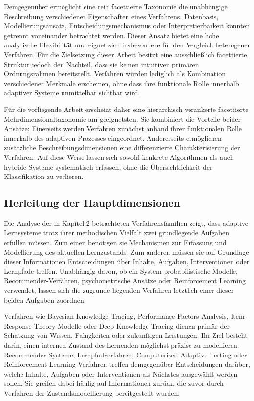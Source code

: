 Demgegenüber ermöglicht eine rein facettierte Taxonomie die unabhängige
Beschreibung verschiedener Eigenschaften eines Verfahrens. Datenbasis,
Modellierungsansatz, Entscheidungsmechanismus oder Interpretierbarkeit
könnten getrennt voneinander betrachtet werden. Dieser Ansatz bietet
eine hohe analytische Flexibilität und eignet sich insbesondere für den
Vergleich heterogener Verfahren. Für die Zielsetzung dieser Arbeit
besitzt eine ausschließlich facettierte Struktur jedoch den Nachteil,
dass sie keinen intuitiven primären Ordnungsrahmen bereitstellt.
Verfahren würden lediglich als Kombination verschiedener Merkmale
erscheinen, ohne dass ihre funktionale Rolle innerhalb adaptiver Systeme
unmittelbar sichtbar wird.

Für die vorliegende Arbeit erscheint daher eine hierarchisch verankerte
facettierte Mehrdimensionaltaxonomie am geeignetsten. Sie kombiniert die
Vorteile beider Ansätze: Einerseits werden Verfahren zunächst anhand
ihrer funktionalen Rolle innerhalb des adaptiven Prozesses eingeordnet.
Andererseits ermöglichen zusätzliche Beschreibungsdimensionen eine
differenzierte Charakterisierung der Verfahren. Auf diese Weise lassen
sich sowohl konkrete Algorithmen als auch hybride Systeme systematisch
erfassen, ohne die Übersichtlichkeit der Klassifikation zu verlieren.

\subsection{Herleitung der
Hauptdimensionen}\label{herleitung-der-hauptdimensionen}

Die Analyse der in Kapitel 2 betrachteten Verfahrensfamilien zeigt, dass
adaptive Lernsysteme trotz ihrer methodischen Vielfalt zwei grundlegende
Aufgaben erfüllen müssen. Zum einen benötigen sie Mechanismen zur
Erfassung und Modellierung des aktuellen Lernzustands. Zum anderen
müssen sie auf Grundlage dieser Informationen Entscheidungen über
Inhalte, Aufgaben, Interventionen oder Lernpfade treffen. Unabhängig
davon, ob ein System probabilistische Modelle, Recommender-Verfahren,
psychometrische Ansätze oder Reinforcement Learning verwendet, lassen
sich die zugrunde liegenden Verfahren letztlich einer dieser beiden
Aufgaben zuordnen.

Verfahren wie Bayesian Knowledge Tracing, Performance Factors Analysis,
Item-Response-Theory-Modelle oder Deep Knowledge Tracing dienen primär
der Schätzung von Wissen, Fähigkeiten oder zukünftigen Leistungen. Ihr
Ziel besteht darin, einen internen Zustand des Lernenden möglichst
präzise zu modellieren. Recommender-Systeme, Lernpfadverfahren,
Computerized Adaptive Testing oder Reinforcement-Learning-Verfahren
treffen demgegenüber Entscheidungen darüber, welche Inhalte, Aufgaben
oder Interventionen als Nächstes ausgewählt werden sollen. Sie greifen
dabei häufig auf Informationen zurück, die zuvor durch Verfahren der
Zustandsmodellierung bereitgestellt wurden.

